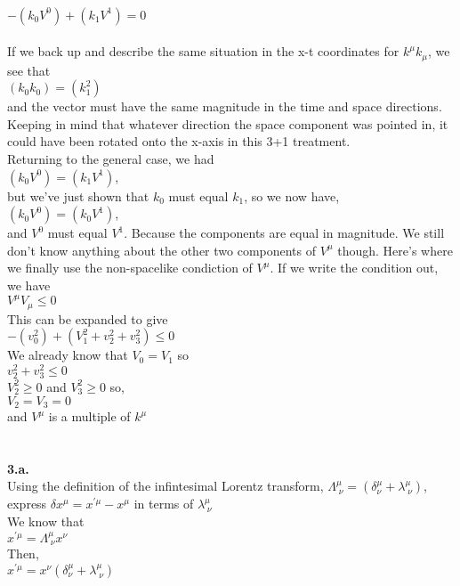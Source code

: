 \documentclass[prb,preprint]
{revtex4-1}
\newcommand{\PRLsep}{\noindent\makebox[\linewidth]{\resizebox{0.8888\linewidth}{2pt}{$\bullet$}}\bigskip}
\begin{document}
\\
$-\left(k_0 V^0\right) + \left(k_1 V^1\right) = 0$
\\
\\
If we back up and describe the same situation in the x-t coordinates for $k^\mu k_\mu$, we see that 
\\
$\left(k_0 k_0\right) = \left(k_1^2\right)$
\\
and the vector must have the same magnitude in the time and space directions.  Keeping in mind that whatever direction the space component was pointed in, it could have been rotated onto the x-axis in this 3+1 treatment.
\\
Returning to the general case, we had 
\\
$\left(k_0 V^0\right) = \left(k_1 V^1\right)$, 
\\
but we've just shown that $k_0$ must equal $k_1$, so we now have, 
\\
$\left(k_0 V^0\right) = \left(k_0 V^1\right)$, 
\\
and $V^0$ must equal $V^1$.  Because the components are equal in magnitude.  We still don't know anything about the other two components of $V^\mu$ though.  Here's where we finally use the non-spacelike condiction of $V^\mu$.  If we write the condition out, we have 
\\
$V^\mu V_\mu \leq 0$
\\
This can be expanded to give 
\\
$-\left(v_0^2\right) + \left(V_1^2 + v_2^2 + v_3^2\right) \leq 0$
\\
We already know that $V_0 = V_1$ so
\\
$v_2^2 + v_3^2 \leq 0$
\\
$V_2^2 \geq 0$ and $V_3^2 \geq 0$ so,
\\
$V_2 = V_3 = 0$
\\
and $V^\mu$ is a multiple of $k^\mu$
\\
\\
\PRLsep
\\
\textbf{3.a.}
\\
Using the definition of the infintesimal Lorentz transform, $\Lambda^\mu_{\;\nu} = \left(\delta^\mu_\nu + \lambda^\mu_{\;\nu}\right)$, 
express $\delta x^\mu = x^{\prime\mu} - x^\mu$ in terms of $\lambda^\mu_{\;\nu}$
\\
We know that 
\\
$x^{\prime\mu} = \Lambda^\mu_{\;\nu} x^\nu$
\\
Then,
\\
$x^{\prime\mu} = x^\nu\left(\delta^\mu_\nu + \lambda^\mu_{\;\nu}\right) $
\end{document}
